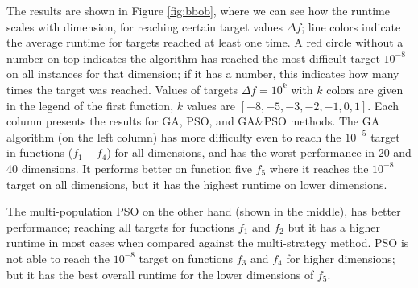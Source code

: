 \documentclass[runningheads]{llncs}
\begin{document}
The results are shown in Figure \ref{fig:bbob}, where we can see how
the runtime scales with dimension, for reaching certain target values $\Delta f$;
line colors indicate the average runtime for targets reached
at least one time. A red circle without a number on top indicates the algorithm
has reached the most difficult target $10^{-8}$ on all instances for that dimension;
if it has a number, this indicates how many times the target was reached.
Values of targets $\Delta f = 10^{k}$ with $k$ colors are
given in the legend of the first function, $k$ values are $[-8,-5,-3,-2,-1,0,1]$. 
Each column presents the results for GA, PSO, and GA\&PSO methods.
The GA algorithm (on the left column) has more difficulty even to reach the
$10^{-5}$ target in functions ($f_1-f_4$) for all dimensions, and has the worst
performance in 20 and 40 dimensions. It performs better on function five $f_5$
where it reaches the $10^{-8}$ target on all dimensions, but it has the highest runtime on lower
dimensions. 

The multi-population PSO on the other hand (shown in the middle),
has better performance; reaching all targets for functions $f_1$ and $f_2$ but 
it has a higher runtime in most cases when compared against the multi-strategy method. 
PSO is not able to reach the $10^{-8}$ target on functions $f_3$ and $f_4$ for higher dimensions; 
but it has the best overall runtime for the lower dimensions of $f_5$.
\end{document}
